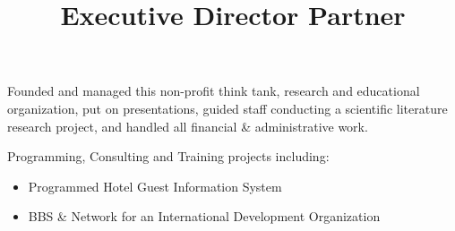 \begin{resume}
\title{ Executive Director }
\begin{position}
Founded and managed this non-profit think tank, research and educational 
organization, put on presentations, guided staff conducting a scientific 
literature research project, and handled all financial \& administrative work.
\end{position}



\title{ Partner }
\begin{position}
Programming, Consulting and Training projects including:
\begin{itemize}
\item Programmed Hotel Guest Information System
\item BBS \& Network for an International Development Organization
\end{itemize}

\end{position}







\end{resume}
